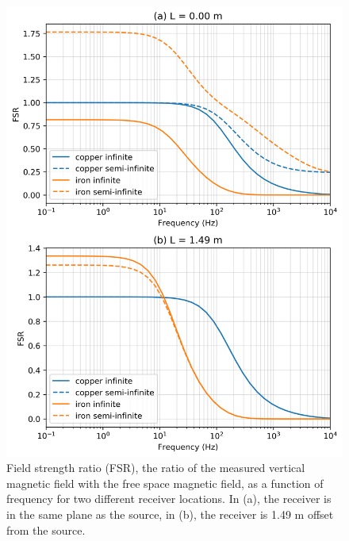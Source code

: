 \begin{figure}
    \begin{center}
    \includegraphics[width=0.6\columnwidth]{figures/casing_software/AugustinFSR.png}
    \end{center}
\caption{
    Field strength ratio (FSR), the ratio of the measured vertical magnetic field with the free space magnetic field, as a function of frequency for two different receiver locations.
    In (a), the receiver is in the same plane as the source, in (b), the receiver is 1.49 m offset from the source.
}
\label{fig:AugustinFSR}
\end{figure}
